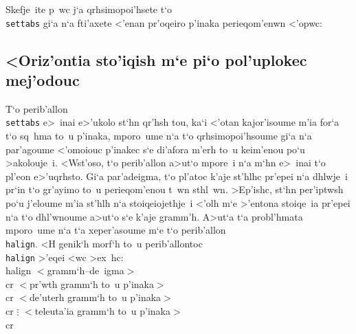 \exercise Skefje~ite p~wc j`a qrhsimopoi'hsete t`o {\tt\\settabs} gi`a
n`a fti'axete <'enan pr'oqeiro p'inaka perieqom'enwn <'opwc:
\medskip
{}

\subsection{<Oriz'ontia sto'iqish m`e pi`o pol'uplokec mej'odouc}

T`o perib'allon {\tt \\settabs} e>~inai e>'ukolo st`hn qr'hsh tou, ka`i
<'otan kajor'isoume m'ia for`a t`o sq~hma to~u p'inaka, mporo~ume n`a
t`o qrhsimopoi'hsoume gi`a n`a par'agoume <'omoiouc p'inakec s`e
di'afora m'erh to~u keim'enou po`u >akolouje~i. <Wst'oso, t`o
perib'allon a>ut`o mpore~i n`a m`hn e>~inai t`o pl'eon e>'uqrhsto.  Gi`a
par'adeigma, t`o pl'atoc k'aje st'hlhc pr'epei n`a dhlwje~i pr`in t`o
gr'ayimo to~u perieqom'enou t~wn sthl~wn.  >Ep'ishc, st`hn per'iptwsh
po`u j'eloume m'ia st'hlh n`a stoiqeiojethje~i <'olh m`e >'entona
stoiqe~ia pr'epei n`a t`o dhl'wnoume a>ut`o s`e k'aje gramm'h. A>ut`a
t`a probl'hmata mporo~ume n`a t`a xeper'asoume m`e t`o perib'allon
{\tt\\halign}.
<H genik`h morf`h to~u perib'allontoc {\tt \\halign} >'eqei <wc >ex~hc:
\beginuser
\\halign\lb{} $<${\tengs gramm`h--de~igma\/}$>$ \\cr
$<${\tengs pr'wth gramm`h to~u p'inaka\/}$>$ \\cr
$<${\tengs de'uterh gramm`h to~u p'inaka\/}$>$ \\cr
$\vdots$
$<${\tengs teleuta'ia gramm`h to~u p'inaka\/}$>$ \\cr
\rb
\enduser

